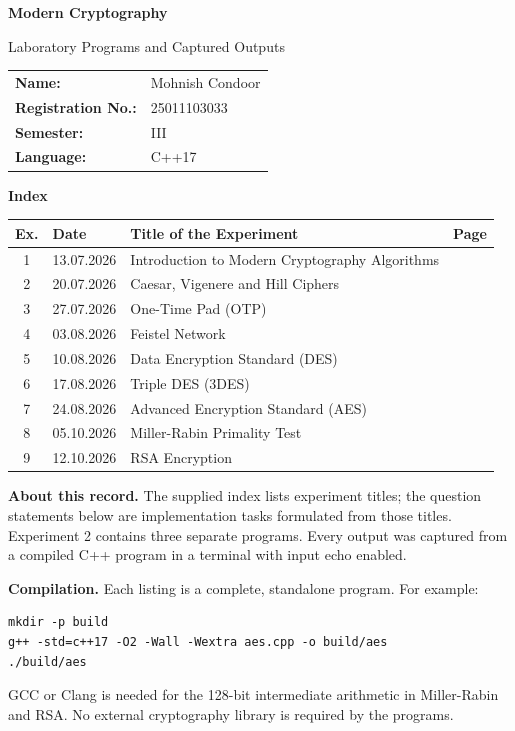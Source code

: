 \documentclass[11pt,a4paper]{article}
\begin{document}
\thispagestyle{empty}
{\LARGE\bfseries Modern Cryptography\par}
{\large Laboratory Programs and Captured Outputs\par}
\vspace{5mm}
\begin{tabular}{@{}ll@{}}
\textbf{Name:} & Mohnish Condoor \\
\textbf{Registration No.:} & 25011103033 \\
\textbf{Semester:} & III \\
\textbf{Language:} & C++17 \\
\end{tabular}
\vspace{6mm}

{\large\bfseries Index\par}
\renewcommand{\arraystretch}{1.35}
\begin{tabular}{@{}c l p{95mm} r@{}}
\toprule
\textbf{Ex.} & \textbf{Date} & \textbf{Title of the Experiment} & \textbf{Page} \\
\midrule
1 & 13.07.2026 & Introduction to Modern Cryptography Algorithms & \pageref{exp:introduction} \\
2 & 20.07.2026 & Caesar, Vigenere and Hill Ciphers & \pageref{exp:caesar} \\
3 & 27.07.2026 & One-Time Pad (OTP) & \pageref{exp:one-time-pad} \\
4 & 03.08.2026 & Feistel Network & \pageref{exp:feistel} \\
5 & 10.08.2026 & Data Encryption Standard (DES) & \pageref{exp:des} \\
6 & 17.08.2026 & Triple DES (3DES) & \pageref{exp:triple-des} \\
7 & 24.08.2026 & Advanced Encryption Standard (AES) & \pageref{exp:aes} \\
8 & 05.10.2026 & Miller-Rabin Primality Test & \pageref{exp:miller-rabin} \\
9 & 12.10.2026 & RSA Encryption & \pageref{exp:rsa} \\
\bottomrule
\end{tabular}
\vspace{6mm}

\textbf{About this record.} The supplied index lists experiment titles; the question statements below are implementation tasks formulated from those titles. Experiment 2 contains three separate programs. Every output was captured from a compiled C++ program in a terminal with input echo enabled.

\textbf{Compilation.} Each listing is a complete, standalone program. For example:
\begin{lstlisting}[style=terminal]
mkdir -p build
g++ -std=c++17 -O2 -Wall -Wextra aes.cpp -o build/aes
./build/aes
\end{lstlisting}
GCC or Clang is needed for the 128-bit intermediate arithmetic in Miller-Rabin and RSA. No external cryptography library is required by the programs.
\end{document}

